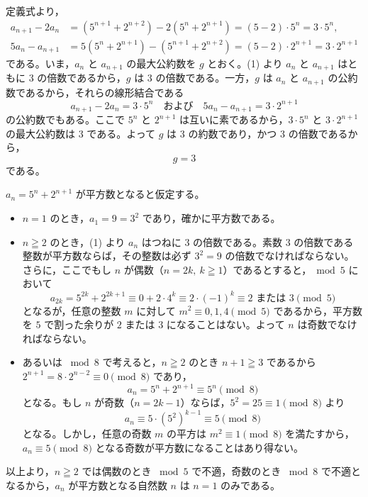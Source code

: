 定義式より，
\begin{align*}
  a_{n+1} - 2a_{n} &= \left(5^{n+1}+2^{n+2}\right) - 2\left(5^{n}+2^{n+1}\right) = (5-2)\cdot 5^{n} = 3\cdot 5^{n},\\
  5a_{n} - a_{n+1} &= 5\left(5^{n}+2^{n+1}\right) - \left(5^{n+1}+2^{n+2}\right) = (5-2)\cdot 2^{n+1} = 3\cdot 2^{n+1}
\end{align*}
である。いま，$a_{n}$ と $a_{n+1}$ の最大公約数を $g$ とおく。(1) より $a_{n}$ と $a_{n+1}$ はともに $3$ の倍数であるから，$g$ は $3$ の倍数である。一方，$g$ は $a_{n}$ と $a_{n+1}$ の公約数であるから，それらの線形結合である
\[
  a_{n+1}-2a_{n} = 3\cdot 5^{n} \quad\text{および}\quad 5a_{n}-a_{n+1} = 3\cdot 2^{n+1}
\]
の公約数でもある。ここで $5^{n}$ と $2^{n+1}$ は互いに素であるから，$3\cdot 5^{n}$ と $3\cdot 2^{n+1}$ の最大公約数は $3$ である。よって $g$ は $3$ の約数であり，かつ $3$ の倍数であるから，
\[
  g = 3
\]
である。


$a_{n}=5^{n}+2^{n+1}$ が平方数となると仮定する。
\begin{itemize}[leftmargin=1.6em,itemsep=2pt]
  \item $n=1$ のとき，$a_{1}=9=3^{2}$ であり，確かに平方数である。
  \item $n\geqq 2$ のとき，(1) より $a_{n}$ はつねに $3$ の倍数である。素数 $3$ の倍数である整数が平方数ならば，その整数は必ず $3^{2}=9$ の倍数でなければならない。さらに，ここでもし $n$ が偶数（$n=2k,\ k\geqq 1$）であるとすると，$\bmod 5$ において
  \[
    a_{2k} = 5^{2k} + 2^{2k+1} \equiv 0 + 2\cdot 4^{k} \equiv 2\cdot (-1)^{k} \equiv 2\text{ または }3 \pmod{5}
  \]
  となるが，任意の整数 $m$ に対して $m^{2}\equiv 0, 1, 4\pmod{5}$ であるから，平方数を $5$ で割った余りが $2$ または $3$ になることはない。よって $n$ は奇数でなければならない。
  \item あるいは $\bmod 8$ で考えると，$n\geqq 2$ のとき $n+1\geqq 3$ であるから $2^{n+1}=8\cdot 2^{n-2}\equiv 0\pmod{8}$ であり，
  \[
    a_{n} = 5^{n} + 2^{n+1} \equiv 5^{n} \pmod{8}
  \]
  となる。もし $n$ が奇数（$n=2k-1$）ならば，$5^{2}=25\equiv 1\pmod{8}$ より
  \[
    a_{n} \equiv 5\cdot (5^{2})^{k-1} \equiv 5 \pmod{8}
  \]
  となる。しかし，任意の奇数 $m$ の平方は $m^{2}\equiv 1\pmod{8}$ を満たすから，$a_{n}\equiv 5\pmod{8}$ となる奇数が平方数になることはあり得ない。
\end{itemize}
以上より，$n\geqq 2$ では偶数のとき $\bmod 5$ で不適，奇数のとき $\bmod 8$ で不適となるから，$a_{n}$ が平方数となる自然数 $n$ は $n=1$ のみである。

